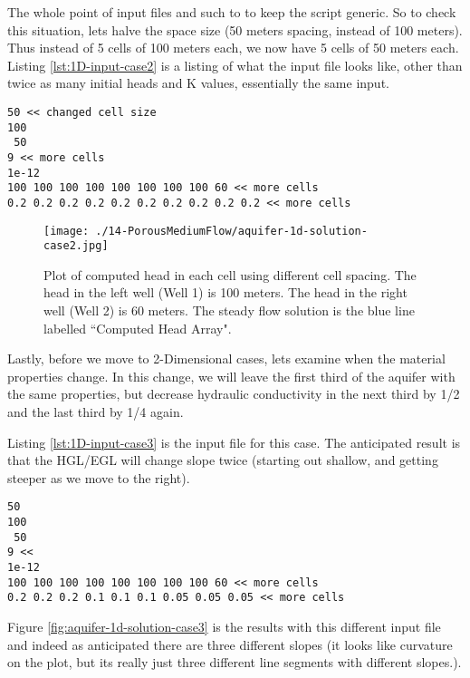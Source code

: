 The whole point of input files and such to to keep the script generic.  
So to check this situation, lets halve the space size (50 meters spacing, instead of 100 meters).
Thus instead of 5 cells of 100 meters each, we now have 5 cells of 50 meters each.
Listing \ref{lst:1D-input-case2} is a listing of what the input file looks like, other than twice as many initial heads and K values, essentially the same input.
\begin{lstlisting}[caption= Input File for Example Problem \\ , label=lst:1D-input-case2]
50 << changed cell size
100
 50
9 << more cells
1e-12
100 100 100 100 100 100 100 100 60 << more cells
0.2 0.2 0.2 0.2 0.2 0.2 0.2 0.2 0.2 0.2 << more cells
\end{lstlisting}

\begin{figure}[h!] %
   \centering
   \texttt{[image: ./14-PorousMediumFlow/aquifer-1d-solution-case2.jpg]} 
   \caption{Plot of computed head in each cell using different cell spacing.   The head in the left well (Well 1) is 100 meters.   The head in the right well (Well 2) is 60 meters.  The steady flow solution is the blue line labelled ``Computed Head Array".}
   \label{fig:aquifer-1d-solution-case2}
\end{figure}

Lastly, before we move to 2-Dimensional cases, lets examine when the material properties change.  
In this change, we will leave the first third of the aquifer with the same properties, but decrease hydraulic conductivity in the next third by 1/2 and the last third by 1/4 again.

Listing \ref{lst:1D-input-case3} is the input file for this case.  The anticipated result is that the HGL/EGL will change slope twice (starting out shallow, and getting steeper as we move to the right).
\clearpage
\begin{lstlisting}[caption= Input File for Example Problem \\ , label=lst:1D-input-case3]
50 
100
 50
9 << 
1e-12
100 100 100 100 100 100 100 100 60 << more cells
0.2 0.2 0.2 0.1 0.1 0.1 0.05 0.05 0.05 << more cells
\end{lstlisting}

Figure \ref{fig:aquifer-1d-solution-case3} is the results with this different input file and indeed as anticipated there are three different slopes (it looks like curvature on the plot, but its really just three different line segments with different slopes.).

